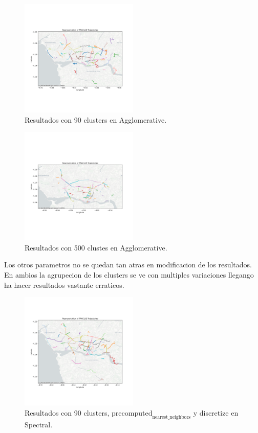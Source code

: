 \begin{figure}[h!]
    \centering
    \includegraphics[width=0.5\textwidth]{img/Taxis/map_agglo_90.png}
    \caption{Resultados con 90 clusters en Agglomerative.}
    \label{fig:agglo_90}
\end{figure}

\begin{figure}[h!]
    \centering
    \includegraphics[width=0.5\textwidth]{img/Taxis/map_agglo_500.png}
    \caption{Resultados con 500 clustes en Agglomerative.}
    \label{fig:agglo_500}
\end{figure}

Los otros parametros no se quedan tan atras en modificacion de los resultados. En ambios la agrupecion de los clusters se ve con multiples variaciones llegango ha hacer resultados vastante erraticos.

\begin{figure}[h!]
    \centering
    \includegraphics[width=0.5\textwidth]{img/Taxis/map_spect_par.png}
    \caption{Resultados con 90 clusters, $\text{precomputed}_{\text{nearest\_neighbors}}$ y discretize en Spectral.}
    \label{fig:spectal_par}
\end{figure}

